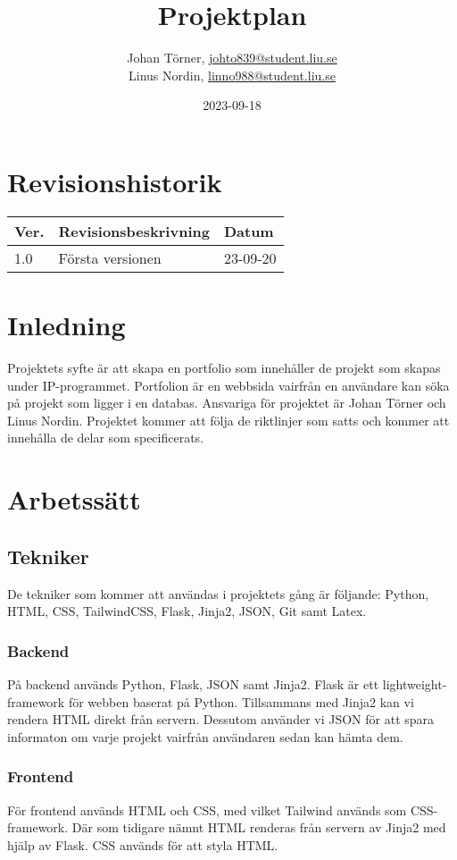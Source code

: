 \documentclass{TDP003mall}
\author{Johan Törner, \url{johto839@student.liu.se}\\
  Linus Nordin, \url{linno988@student.liu.se}}
\title{Projektplan}
\date{2023-09-18}
\begin{document}
\projectpage
\section{Revisionshistorik}
\begin{table}[!h]
\begin{tabularx}{\linewidth}{|l|X|l|}
\hline
Ver. & Revisionsbeskrivning & Datum \\\hline
1.0 & Första versionen & 23-09-20\\\hline
\end{tabularx}
\end{table}


\section{Inledning}
Projektets syfte är att skapa en portfolio som innehåller de projekt som skapas under IP-programmet. 
Portfolion är en webbsida vairfrån en användare kan söka på projekt som ligger i en databas. Ansvariga för projektet 
är Johan Törner och Linus Nordin. Projektet kommer att följa de riktlinjer som satts och kommer att innehålla de delar
som specificerats. 


\section{Arbetssätt}

\subsection{Tekniker}
De tekniker som kommer att användas i projektets gång är följande: Python, HTML, CSS, TailwindCSS, Flask, Jinja2, JSON, Git samt Latex. 

\subsubsection{Backend}
På backend används Python, Flask, JSON samt Jinja2. Flask är ett lightweight-framework för webben baserat på Python.
Tillsammans med Jinja2 kan vi rendera HTML direkt från servern. Dessutom använder vi JSON för att spara informaton om varje projekt vairfrån
användaren sedan kan hämta dem.


\subsubsection{Frontend}
För frontend används HTML och CSS, med vilket Tailwind används som CSS-framework.
Där som tidigare nämnt HTML renderas från servern av Jinja2 med hjälp av Flask. CSS används för att styla HTML. 
\end{document}
